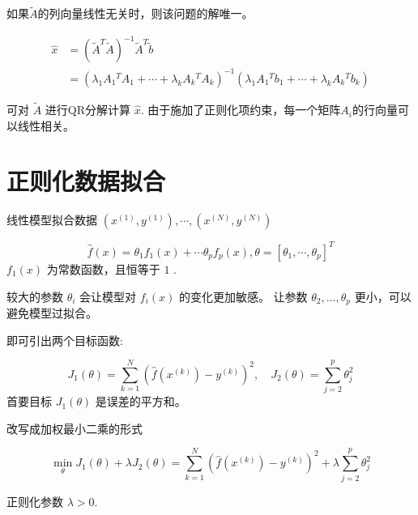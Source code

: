 \begin{theorem}
    如果$\tilde{A}$的列向量线性无关时，则该问题的解唯一。

\begin{equation}\begin{aligned} \hat{x}&=\left(\tilde{A}^{T} \tilde{A}\right)^{-1} \tilde{A}^{T} \tilde{b} \\
&= \left(\lambda_{1} A_{1}{ }^{T} A_{1}+\cdots+\lambda_{k} A_{k}{ }^{T} A_{k}\right)^{-1}\left(\lambda_{1} A_{1}{ }^{T} b_{1}+\cdots+\lambda_{k} A_{k}{ }^{T} b_{k}\right) \end{aligned} \end{equation}
\end{theorem}



可对 $ \tilde{A} $ 进行QR分解计算 $ \hat{x} $. 由于施加了正则化项约束，每一个矩阵$A_i$的行向量可以线性相关。



\section{正则化数据拟合}

\begin{problem}
    线性模型拟合数据 $ \left(x^{(1)}, y^{(1)}\right), \cdots,\left(x^{(N)}, y^{(N)}\right) $

    \begin{equation}
\hat{f}(x)=\theta_{1} f_{1}(x)+\cdots \theta_{p} f_{p}(x), \theta=\left[\theta_{1}, \cdots, \theta_{p}\right]^{T}
\end{equation}
$ f_{1}(x) $ 为常数函数，且恒等于 $1$ .
\end{problem}


较大的参数 $ \theta_{i} $ 会让模型对 $ f_{i}(x) $ 的变化更加敏感。 让参数 $ \theta_{2}, \ldots, \theta_{p} $ 更小，可以避免模型过拟合。

即可引出两个目标函数:

\begin{problem}
    \begin{equation}
J_{1}(\theta)=\sum_{k=1}^{N}\left(\hat{f}\left(x^{(k)}\right)-y^{(k)}\right)^{2}, \quad J_{2}(\theta)=\sum_{j=2}^{p} \theta_{j}^{2}
\end{equation}
首要目标 $ J_{1}(\theta) $ 是误差的平方和。
\end{problem}

改写成加权最小二乘的形式

\begin{problem}
    \begin{equation}
\min _{\theta} J_{1}(\theta)+\lambda J_{2}(\theta)=\sum_{k=1}^{N}\left(\hat{f}\left(x^{(k)}\right)-y^{(k)}\right)^{2}+\lambda \sum_{j=2}^{p} \theta_{j}^{2}
\end{equation}

正则化参数 $ \lambda>0 $.
\end{problem}





